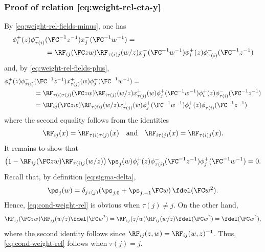 \documentclass[reqno]{amsart}
\numberwithin{equation}{section}
\begin{document}

\subsubsection{Proof of relation \eqref{eq:weight-rel-eta-y}}\label{sss:QSP-weight-rel}
By \eqref{eq:weight-rel-fields-minus}, one has
\begin{align}
\phi_i^+(z)\phi_{\tau(i)}^-&(\FC^{-1}z^{-1})x^-_j(\FC^{-1}w^{-1})=\\
&=\RF_{ij}(\FC zw)\RF_{\tau(i)j}(w/z)
x^-_j(\FC^{-1}w^{-1})\phi_i^+(z)\phi_{\tau(i)}^-(\FC^{-1}z^{-1})
\end{align}
and, by \eqref{eq:weight-rel-fields-plus}, 
\begin{align}
	\phi_i^+(z)\phi_{\tau(i)}^-&(\FC^{-1}z^{-1})x^+_{\tau(j)}(w)\phi_{j}^+(\FC^{-1}w^{-1})=\\
	&=\RF_{\tau(i)\tau(j)}(\FC zw)\RF_{i\tau(j)}(w/z)
	x^+_{\tau(j)}(w)\phi_{j}^+(\FC^{-1}w^{-1})\phi_i^+(z)\phi_{\tau(i)}^-(\FC^{-1}z^{-1})\\
	&=\RF_{ij}(\FC zw)\RF_{\tau(i)j}(w/z)
	x^+_{\tau(j)}(w)\phi_{j}^+(\FC^{-1}w^{-1})\phi_i^+(z)\phi_{\tau(i)}^-(\FC^{-1}z^{-1})
\end{align}
where the second equality follows from the identities
\begin{equation}\label{eq:rho-symmetry}
\RF_{ij}(x)=\RF_{\tau(i)\tau(j)}(x)
\quad\mbox{and}\quad
\RF_{i\tau(j)}(x)=\RF_{\tau(i)j}(x).
\end{equation}
It remains to show that
\begin{equation}\label{eq:cond-weight-rel}
	\left(1-\RF_{ij}(\FC zw)\RF_{\tau(i)j}(w/z)\right)\ps_j(w)
	\phi_i^+(z)\phi_{\tau(i)}^-(\FC^{-1}z^{-1})\phi_j^+(\FC^{-1}w^{-1})
	=0.
\end{equation}
Recall that, by definition \eqref{eq:sigma-delta},
\begin{equation}
	\ps_j(w)=\delta_{j\tau(j)}(\ps_{j,0}+\ps_{j,-1}\FC w)\,\fdel(\FC w^2).
\end{equation}
Hence, \eqref{eq:cond-weight-rel} is obvious when $\tau(j)\neq j$.
On the other hand, 
	\begin{align}\label{eq:sigma-delta-2}
	\RF_{ij}(\FC zw)\RF_{ij}(w/z)\fdel(\FC w^2)=
	\RF_{ij}(z/w)\RF_{ij}(w/z)\fdel(\FC w^2)=\fdel(\FC w^2),
\end{align}
where the second identity follows since $\RF_{ij}(z,w)=\RF_{ij}(w,z)^{-1}$.
Thus, \eqref{eq:cond-weight-rel} follows when $\tau(j)=j$.
\end{document}
